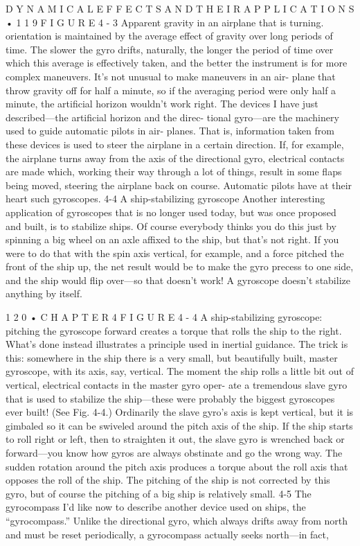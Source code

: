 \documentclass[10pt,oneside]{article}
\begin{document}
D Y N A M I C A L  E F F E C T S  A N D  T H E I R  A P P L I C A T I O N S • 1 1 9 F I G U R E  4 - 3 Apparent gravity in an airplane that is turning. orientation is maintained by the average effect of gravity over long periods of time. The slower the gyro drifts, naturally, the longer the period of time over which this average is effectively taken, and the better the instrument is for more complex maneuvers. It’s not unusual to make maneuvers in an air- plane that throw gravity off for half a minute, so if the averaging period were only half a minute, the artificial horizon wouldn’t work right. The devices I have just described---the artificial horizon and the direc- tional gyro---are the machinery used to guide automatic pilots in air- planes. That is, information taken from these devices is used to steer the airplane in a certain direction. If, for example, the airplane turns away from the axis of the directional gyro, electrical contacts are made which, working their way through a lot of things, result in some flaps being moved, steering the airplane back on course. Automatic pilots have at their heart such gyroscopes. 4-4 A ship-stabilizing gyroscope Another interesting application of gyroscopes that is no longer used today, but was once proposed and built, is to stabilize ships. Of course everybody thinks you do this just by spinning a big wheel on an axle affixed to the ship, but that’s not right. If you were to do that with the spin axis vertical, for example, and a force pitched the front of the ship up, the net result would be to make the gyro precess to one side, and the ship would flip over---so that doesn’t work! A gyroscope doesn’t stabilize anything by itself.\par

1 2 0 • C H A P T E R  4 F I G U R E  4 - 4 A ship-stabilizing gyroscope: pitching the gyroscope forward creates a torque that rolls the ship to the right. What’s done instead illustrates a principle used in inertial guidance. The trick is this: somewhere in the ship there is a very small, but beautifully built, master gyroscope, with its axis, say, vertical. The moment the ship rolls a little bit out of vertical, electrical contacts in the master gyro oper- ate a tremendous slave gyro that is used to stabilize the ship---these were probably the biggest gyroscopes ever built! (See Fig. 4-4.) Ordinarily the slave gyro’s axis is kept vertical, but it is gimbaled so it can be swiveled around the pitch axis of the ship. If the ship starts to roll right or left, then to straighten it out, the slave gyro is wrenched back or forward---you know how gyros are always obstinate and go the wrong way. The sudden rotation around the pitch axis produces a torque about the roll axis that opposes the roll of the ship. The pitching of the ship is not corrected by this gyro, but of course the pitching of a big ship is relatively small. 4-5 The gyrocompass I’d like now to describe another device used on ships, the “gyrocompass.” Unlike the directional gyro, which always drifts away from north and must be reset periodically, a gyrocompass actually seeks north---in fact,\par
\end{document}
